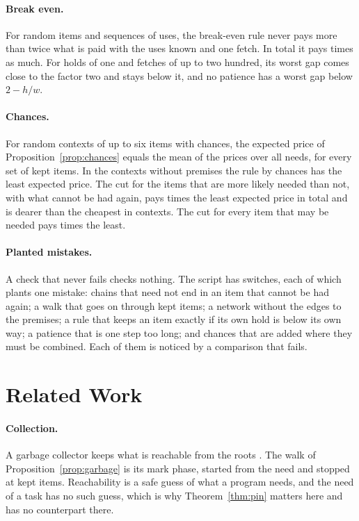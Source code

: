 \documentclass[acmsmall,nonacm,screen]{acmart}
\newcommand{\claim}[2]{#2}
\begin{document}
\paragraph{Break even.} \claim{online}{For \exSequences{} random items and sequences of
uses, the break-even rule never pays more than twice what is paid with the uses known and
one fetch. In total it pays \exOnlineRatio{} times as much. For holds of one and fetches of
up to two hundred, its worst gap comes close to the factor two and stays below it, and no
patience has a worst gap below $2 - h/w$.}

\paragraph{Chances.} \claim{chances}{For \exChances{} random contexts of up to six items
with chances, the expected price of Proposition~\ref{prop:chances} equals the mean of the
prices over all needs, for every set of kept items. In the \exFlat{} contexts without
premises the rule by chances has the least expected price. The cut for the items that are
more likely needed than not, with what cannot be had again, pays \exLikelyRatio{} times the
least expected price in total and is dearer than the cheapest in \exLikelyDearer{} contexts.
The cut for every item that may be needed pays \exPossibleRatio{} times the least.}

\paragraph{Planted mistakes.} A check that never fails checks nothing. The script has
\exMutants{} switches, each of which plants one mistake: chains that need not end in an
item that cannot be had again; a walk that goes on through kept items; a network without the
edges to the premises; a rule that keeps an item exactly if its own hold is below its own
way; a patience that is one step too long; and chances that are added where they must be
combined. \claim{all-noticed}{Each of them is noticed
by a comparison that fails.}

\section{Related Work}\label{sec:related}

\paragraph{Collection.} A garbage collector keeps what is reachable from the roots
\citep{McCarthy1960}. The walk of Proposition~\ref{prop:garbage} is its mark phase, started
from the need and stopped at kept items. Reachability is a safe guess of what a program
needs, and the need of a task has no such guess, which is why Theorem~\ref{thm:pin} matters
here and has no counterpart there.
\end{document}
